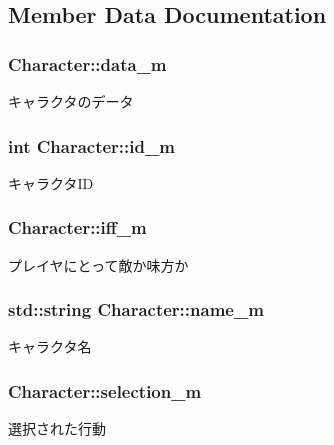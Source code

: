 \subsection{Member Data Documentation}
\hypertarget{class_character_abdd384831f34238538de88709016afe8}{}
\subsubsection[{data\+\_\+m}]{ Character\+::data\+\_\+m}\label{class_character_abdd384831f34238538de88709016afe8}
キャラクタのデータ \hypertarget{class_character_a5e51ea77e9178ae99a33901300e4bc40}{}
\subsubsection[{id\+\_\+m}]{\setlength{\rightskip}{0pt plus 5cm}int Character\+::id\+\_\+m}\label{class_character_a5e51ea77e9178ae99a33901300e4bc40}
キャラクタ\+I\+D \hypertarget{class_character_a2ca852f598c4e20b5d932355379c4ac0}{}
\subsubsection[{iff\+\_\+m}]{ Character\+::iff\+\_\+m\hspace{0.3cm}{\ttfamily [protected]}}\label{class_character_a2ca852f598c4e20b5d932355379c4ac0}
プレイヤにとって敵か味方か \hypertarget{class_character_ae84b80fb6ac2e9271506c84b71d657f6}{}
\subsubsection[{name\+\_\+m}]{\setlength{\rightskip}{0pt plus 5cm}std\+::string Character\+::name\+\_\+m}\label{class_character_ae84b80fb6ac2e9271506c84b71d657f6}
キャラクタ名 \hypertarget{class_character_a55ee12bd3ec2b766fb3cbe20c3333fe6}{}
\subsubsection[{selection\+\_\+m}]{ Character\+::selection\+\_\+m\hspace{0.3cm}{\ttfamily [protected]}}\label{class_character_a55ee12bd3ec2b766fb3cbe20c3333fe6}
選択された行動 

